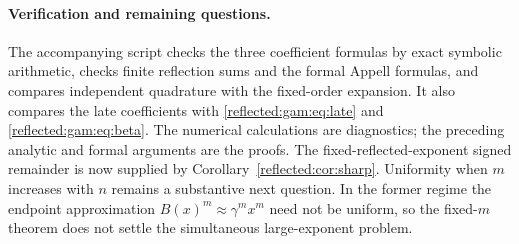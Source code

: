 \paragraph{Verification and remaining questions.}
The accompanying script  checks the
three coefficient formulas by exact symbolic arithmetic, checks finite
reflection sums and the formal Appell formulas, and compares independent
quadrature with the fixed-order expansion.  It also compares the late
coefficients with \eqref{reflected:gam:eq:late} and \eqref{reflected:gam:eq:beta}.
The numerical calculations are diagnostics; the preceding analytic and
formal arguments are the proofs.
The fixed-reflected-exponent signed remainder is now supplied by
Corollary~\ref{reflected:cor:sharp}. Uniformity when $m$ increases with
$n$ remains a substantive next question.
In the former regime the endpoint approximation
$B(x)^m\approx\gamma^m x^m$ need not be uniform, so the fixed-$m$
theorem does not settle the simultaneous large-exponent problem.
